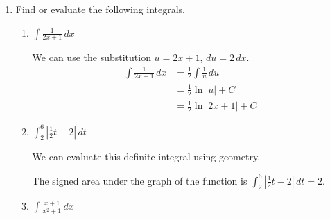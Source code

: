 \documentclass{article}
\begin{document}
\begin{enumerate}
    \item 
    Find or evaluate the following integrals.
    \begin{enumerate}
        \item 
        \begin{problem}[\vfill]
            $\displaystyle\int \frac{1}{2x+1}\, dx$
        \end{problem}

        \begin{solution}
            We can use the substitution $u=2x+1$, $du = 2\,dx$.
            \begin{align*}
                \int \frac{1}{2x+1}\, dx &= \frac{1}{2} \int \frac{1}{u} \, du \\
                &= \frac{1}{2} \ln|u| +C \\
                &= \frac{1}{2}\ln|2x+1| +C 
            \end{align*}
        \end{solution}

        \item 
        \begin{problem}[\vfill]
            $\displaystyle\int_2^6 \left|\tfrac{1}{2}t-2\right|\, dt$
        \end{problem}

        \begin{solution}
            We can evaluate this definite integral using geometry.
            \begin{center}
            \end{center}
            The signed area under the graph of the function is 
            $\displaystyle\int_2^6 \left|\tfrac{1}{2}t-2\right|\, dt=2.$
        \end{solution}

    

     \item 
        \begin{problem}[\vfill\newpage]
            $\displaystyle\int \frac{x+1}{x^2+1}\, dx$
        \end{problem}


\end{enumerate}
\end{enumerate}
\end{document}
